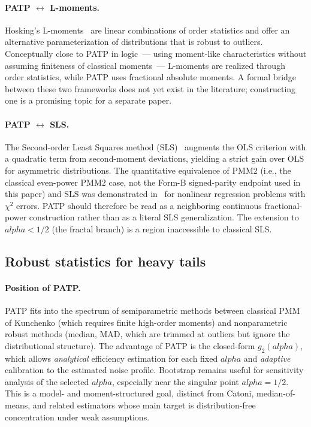 \documentclass[11pt]{article}
\def\alpha{alpha}%
\theoremstyle{definition}
\begin{document}
\paragraph{PATP $\leftrightarrow$ L-moments.}
Hosking's L-moments~\citep{hosking1990lmoments} are linear combinations of
order statistics and offer an alternative parameterization of distributions
that is robust to outliers. Conceptually close to PATP in logic~--- using
moment-like characteristics without assuming finiteness of classical
moments~--- L-moments are realized through order statistics, while PATP
uses fractional absolute moments. A formal bridge between these two
frameworks does not yet exist in the literature; constructing one is a
promising topic for a separate paper.

\paragraph{PATP $\leftrightarrow$ SLS.}
The Second-order Least Squares method
(SLS)~\citep{wang2008sls} augments the OLS criterion with a quadratic term
from second-moment deviations, yielding a strict gain over OLS for
asymmetric distributions. The quantitative equivalence of PMM2
(i.e., the classical even-power PMM2 case, not the Form-B signed-parity
endpoint used in this paper) and SLS
was demonstrated in~\citep{zabolotnii2024nonlinear} for nonlinear
regression problems with $\chi^2$ errors. PATP should therefore be read as a
neighboring continuous fractional-power construction rather than as a literal
SLS generalization. The extension to $\alpha < 1/2$ (the fractal branch) is a
region inaccessible to classical SLS.

\subsection{Robust statistics for heavy tails}\label{sec:disc:robust}

\paragraph{Position of PATP.}
PATP fits into the spectrum of semiparametric methods between classical PMM
of Kunchenko (which requires finite high-order moments) and nonparametric
robust methods (median, MAD, which are trimmed at outliers but ignore the
distributional structure). The advantage of PATP is the closed-form
$g_2(\alpha)$, which allows \emph{analytical} efficiency estimation for
each fixed $\alpha$ and \emph{adaptive} calibration to the estimated noise
profile. Bootstrap remains useful for sensitivity analysis of the selected
$\alpha$, especially near the singular point $\alpha=1/2$.
This is a model- and moment-structured goal, distinct from Catoni,
median-of-means, and related estimators whose main target is
distribution-free concentration under weak assumptions.
\end{document}
